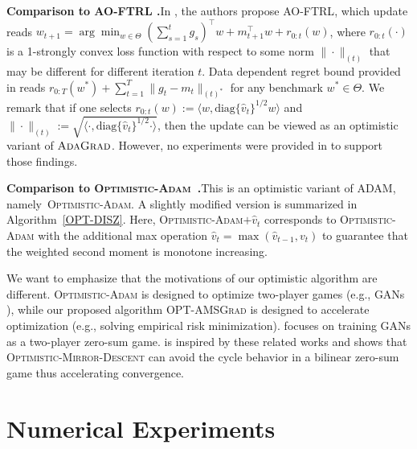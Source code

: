 \documentclass[wcp]{jmlr}
\begin{document}
\noindent \textbf{Comparison to AO-FTRL \citep{MY16}.}\hspace{0.1in}In \citep{MY16}, the authors propose \textsc{AO-FTRL}, which update reads $w_{t+1} = \arg\min_{{w \in \Theta}} ( \sum_{s=1}^t g_s )^{\top}  w + m_{t+1}^\top w + r_{0:t}(w) $, where $r_{0:t}(\cdot)$ is a 1-strongly convex loss function with respect to some norm $\| \cdot\|_{(t)}$ that may be different for different iteration $t$. 
Data dependent regret bound provided in \citep{MY16} reads $r_{{0:T}}(w^*) + \sum_{t=1}^T \| g_t - m_t \|_{(t)^*}$ for any benchmark $w^{*} \in \Theta$. 
We remark that if one selects $r_{0:t}(w) := \langle w, \text{diag}\{\hat{v}_t\}^{1/2} w \rangle$  and $\| \cdot \|_{(t)}:=  \sqrt{ \langle \cdot, \text{diag}\{\hat{v}_t\}^{1/2} \cdot \rangle }$, then the update can be viewed as an optimistic variant of $\textsc{AdaGrad}$. 
However, no experiments were provided in \citep{MY16} to support those findings.

\noindent \textbf{Comparison to \textsc{Optimistic-Adam}~\citep{DISZ18}.}This is an optimistic variant of ADAM, namely~\textsc{Optimistic-Adam}. 
A slightly modified version is summarized in Algorithm~\ref{OPT-DISZ}. 
Here, \textsc{Optimistic-Adam$+\hat{v}_t$} corresponds to \textsc{Optimistic-Adam} with the additional max operation $\hat{v}_t = \max ( \hat{v}_{t-1}, v_t)$ to guarantee that the weighted second moment is monotone increasing.






We want to emphasize that the motivations of our optimistic algorithm are different. 
\textsc{Optimistic-Adam} is designed to optimize two-player games (e.g., GANs \citep{goodfellow2014generative}), while our proposed algorithm \textsc{OPT-AMSGrad} is designed to accelerate optimization (e.g., solving empirical risk minimization).
\citep{DISZ18} focuses on training GANs \citep{goodfellow2014generative} as a two-player zero-sum game. 
\citep{DISZ18} is inspired by these related works and shows that \textsc{Optimistic-Mirror-Descent} can avoid the cycle behavior in a bilinear zero-sum game thus accelerating convergence. 



\vspace{-0.05in}
\section{Numerical Experiments}\label{sec:numerical}
\vspace{-0.05in}
\end{document}
